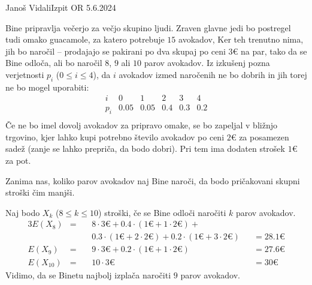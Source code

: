 \begin{naloga}{Janoš Vidali}{Izpit OR 5.6.2024}
\begin{vprasanje}
Bine pripravlja večerjo za večjo skupino ljudi.
Zraven glavne jedi bo postregel tudi omako gua\-ca\-mo\-le,
za katero potrebuje $15$ avokadov,
Ker teh trenutno nima, jih bo naročil
-- prodajajo se pakirani po dva skupaj po ceni $3 €$ na par,
tako da se Bine odloča, ali bo naročil $8$, $9$ ali $10$ parov avokadov.
Iz izkušenj pozna verjetnosti $p_i$ ($0 \le i \le 4$),
da $i$ avokadov izmed naročenih ne bo dobrih in jih torej ne bo mogel uporabiti:
$$
\begin{array}{c|ccccc}
i & 0 & 1 & 2 & 3 & 4 \\ \hline
p_i & 0.05 & 0.05 & 0.4 & 0.3 & 0.2 \\
\end{array}
$$
Če ne bo imel dovolj avokadov za pripravo omake,
se bo zapeljal v bližnjo trgovino,
kjer lahko kupi potrebno število avokadov po ceni $2 €$ za posamezen sadež
(zanje se lahko prepriča, da bodo dobri).
Pri tem ima dodaten strošek $1 €$ za pot.

Zanima nas, koliko parov avokadov naj Bine naroči,
da bodo pričakovani skupni stroški čim manjši.
\end{vprasanje}

\begin{odgovor}
Naj bodo $X_k$ ($8 \le k \le 10$) stroški,
če se Bine odloči naročiti $k$ parov avokadov.
\begin{alignat*}{3}
E(X_8) &=&&\ 8 \cdot 3 € + 0.4 \cdot (1 € + 1 \cdot 2 €) + \\
&&&\ 0.3 \cdot (1 € + 2 \cdot 2 €) + 0.2 \cdot (1 € + 3 \cdot 2 €) &&= 28.1 € \\
E(X_9) &=&&\ 9 \cdot 3 € + 0.2 \cdot (1 € + 1 \cdot 2 €) &&= 27.6 € \\
E(X_{10}) &=&&\ 10 \cdot 3 € &&= 30 €
\end{alignat*}
Vidimo, da se Binetu najbolj izplača naročiti $9$ parov avokadov.
\end{odgovor}
\end{naloga}

